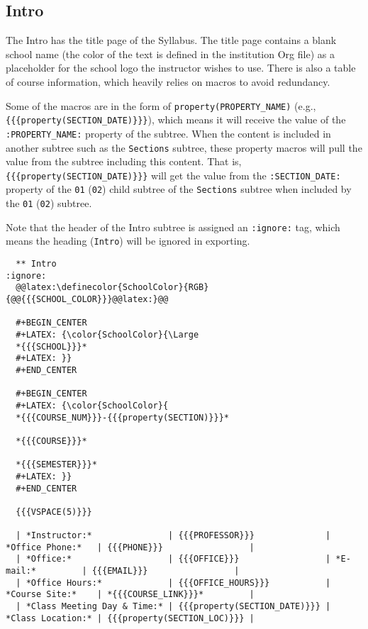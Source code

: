 \documentclass[10pt,article]{article}
\begin{document}
\subsection{Intro}
\label{sec:orgfcc4742}
The Intro has the title page of the Syllabus. The title page contains a blank
school name (the color of the text is defined in the institution Org file) as a
placeholder for the school logo the instructor wishes to use. There is
also a table of course information, which heavily relies on macros
to avoid redundancy.

Some of the macros are in the form of \texttt{property(PROPERTY\_NAME)} (e.g.,
\texttt{\{\{\{property(SECTION\_DATE)\}\}\}}), which means it will receive the value of the
\texttt{:PROPERTY\_NAME:} property of the subtree. When the content is included in
another subtree such as the \texttt{Sections} subtree, these property macros will pull
the value from the subtree including this content. That is,
\texttt{\{\{\{property(SECTION\_DATE)\}\}\}} will get the value from the \texttt{:SECTION\_DATE:}
property of the \texttt{01} (\texttt{02}) child subtree of the \texttt{Sections} subtree when
included by the \texttt{01} (\texttt{02}) subtree.

Note that the header of the Intro subtree is assigned an \texttt{:ignore:} tag, which means the heading (\texttt{Intro})
will be ignored in exporting.

{\scriptsize
\begin{verbatim}
  ** Intro                                                            :ignore:
  @@latex:\definecolor{SchoolColor}{RGB}{@@{{{SCHOOL_COLOR}}}@@latex:}@@

  #+BEGIN_CENTER
  #+LATEX: {\color{SchoolColor}{\Large
  *{{{SCHOOL}}}*
  #+LATEX: }}
  #+END_CENTER
  
  #+BEGIN_CENTER
  #+LATEX: {\color{SchoolColor}{
  *{{{COURSE_NUM}}}-{{{property(SECTION)}}}*
  
  *{{{COURSE}}}*
  
  *{{{SEMESTER}}}*
  #+LATEX: }}
  #+END_CENTER
  
  {{{VSPACE(5)}}}
  
  | *Instructor:*               | {{{PROFESSOR}}}              | *Office Phone:*   | {{{PHONE}}}                 |
  | *Office:*                   | {{{OFFICE}}}                 | *E-mail:*         | {{{EMAIL}}}                 |
  | *Office Hours:*             | {{{OFFICE_HOURS}}}           | *Course Site:*    | *{{{COURSE_LINK}}}*         |
  | *Class Meeting Day & Time:* | {{{property(SECTION_DATE)}}} | *Class Location:* | {{{property(SECTION_LOC)}}} |
\end{verbatim}
}
\end{document}
